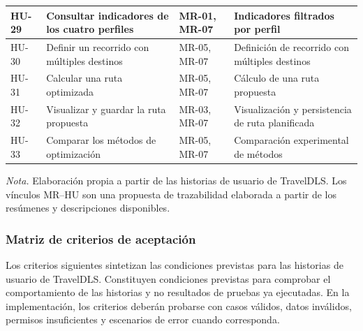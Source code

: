 \begin{longtable}{@{}>{\RaggedRight\arraybackslash}p{1.7cm}>{\RaggedRight\arraybackslash}p{3.9cm}>{\RaggedRight\arraybackslash}p{2.8cm}>{\RaggedRight\arraybackslash}p{7cm}@{}}
		HU-29 & Consultar indicadores de los cuatro perfiles & MR-01, MR-07 & Indicadores filtrados por perfil \\ \midrule
		HU-30 & Definir un recorrido con múltiples destinos & MR-05, MR-07 & Definición de recorrido con múltiples destinos \\ \midrule
		HU-31 & Calcular una ruta optimizada & MR-05, MR-07 & Cálculo de una ruta propuesta \\ \midrule
		HU-32 & Visualizar y guardar la ruta propuesta & MR-03, MR-07 & Visualización y persistencia de ruta planificada \\ \midrule
		HU-33 & Comparar los métodos de optimización & MR-05, MR-07 & Comparación experimental de métodos \\ \midrule
	\end{longtable}
\endgroup
\textit{Nota.} Elaboración propia a partir de las historias de usuario de TravelDLS. Los vínculos MR–HU son una propuesta de trazabilidad elaborada a partir de los resúmenes y descripciones disponibles.

\subsubsection{Matriz de criterios de aceptación}

Los criterios siguientes sintetizan las condiciones previstas para las historias de usuario de TravelDLS. Constituyen condiciones previstas para comprobar el comportamiento de las historias y no resultados de pruebas ya ejecutadas. En la implementación, los criterios deberán probarse con casos válidos, datos inválidos, permisos insuficientes y escenarios de error cuando corresponda.


